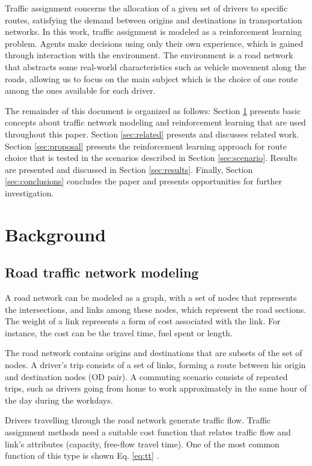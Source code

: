 \documentclass{RITA}
\begin{document}
Traffic assignment concerns the allocation of a given set of drivers to specific routes, satisfying the demand between origins and destinations in transportation networks. In this work, traffic assignment is modeled as a reinforcement learning problem. Agents make decisions using only their own experience, which is gained through interaction with the environment. The environment is a road network that abstracts some real-world characteristics such as vehicle movement along the roads, allowing us to focus on the main subject which is the choice of one route among the ones available for each driver.

The remainder of this document is organized as follows: Section \ref{sec:concepts} presents basic concepts about traffic network modeling and reinforcement learning that are used throughout this paper. Section \ref{sec:related} presents and discusses related work. Section \ref{sec:proposal} presents the reinforcement learning approach for route choice that is tested in the scenarios described in Section \ref{sec:scenario}. Results are presented and discussed in Section \ref{sec:results}. Finally, Section \ref{sec:conclusions} concludes the paper and presents opportunities for further investigation.

\section{Background}
\label{sec:concepts}
\subsection{Road traffic network modeling}

A road network can be modeled as a graph, with a set of nodes that represents the intersections, and links among these nodes, which represent the road sections. The weight of a link represents a form of cost associated with the link. For instance, the cost can be the travel time, fuel spent or length. 

The road network contains origins and destinations that are subsets of the set of nodes. A driver's trip consists of a set of links, forming a route between his origin and destination nodes (OD pair). A commuting scenario consists of repeated trips, such as drivers going from home to work approximately in the same hour of the day during the workdays.

Drivers travelling through the road network generate traffic flow. Traffic assignment methods need a suitable cost function that relates traffic flow and link's attributes (capacity, free-flow travel time). %
One of the most common function of this type is shown Eq. \eqref{eq:tt} \cite[Section~10.1.3]{Ortuzar&Willumsen2001}.
\end{document}
